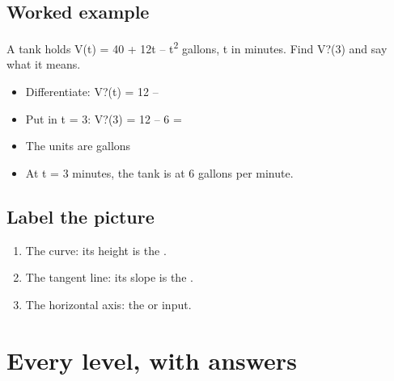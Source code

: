 \documentclass[11pt]{article}
\begin{document}
\subsection*{Worked example}
A tank holds V(t) = 40 + 12t -- t\textsuperscript{2} gallons, t in minutes. Find V?(3) and say what it means.\\
\begin{itemize}
\item Differentiate: V?(t) = 12 -- 
\item Put in t = 3: V?(3) = 12 -- 6 = 
\item The units are gallons 
\item At t = 3 minutes, the tank is  at 6 gallons per minute.
\end{itemize}
\subsection*{Label the picture}
\begin{enumerate}
\item The curve: its height is the .
\item The tangent line: its slope is the .
\item The horizontal axis: the  or input.
\end{enumerate}
\section*{Every level, with answers}
\end{document}

